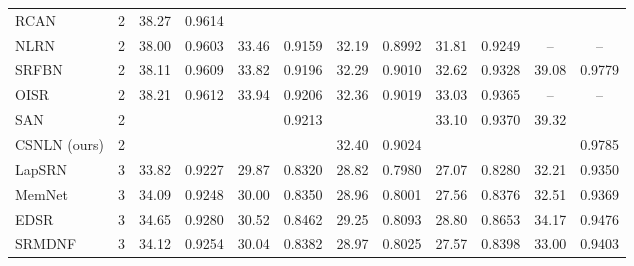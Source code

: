\documentclass[10pt,twocolumn,letterpaper]{article}
\begin{document}
\begin{table*}[thbp]
\begin{center}
\begin{tabular}{|l|c|c|c|c|c|c|c|c|c|c|c|}
\\


RCAN~\cite{zhang2018image} & 2 
& {38.27}
 & {0.9614}
  & \color{red}{34.12}
   & \color{blue}{0.9216}
    & \color{blue}{32.41}
     & \color{blue}{0.9027}
      & \color{red}{33.34}
       & \color{blue}{0.9384}
        & \color{red}{39.44}
         & \color{blue}{0.9786}
\\       
NLRN~\cite{liu2018non}& 2 
& {38.00}
 & {0.9603}
  & {33.46}
   & {0.9159}
    & {32.19}
     & {0.8992}
      & {31.81}
       & {0.9249}
        & {--}
         & {--}
\\
SRFBN~\cite{li2019feedback}& 2 
& {38.11}
 & {0.9609}
  & {33.82}
   & {0.9196}
    & {32.29}
     & {0.9010}
      & {32.62}
       & {0.9328}
        & {39.08}
         &{0.9779}
\\
 OISR~\cite{he2019ode} & 2 
& {38.21}
 & {0.9612}
  & {33.94}
   & {0.9206}
    & {32.36}
     & {0.9019}
      & {33.03}
       & {0.9365}
        &--
         & --      
\\
SAN~\cite{dai2019second} & 2 
& \color{red}{38.31}
 & \color{red}{0.9620}
  & \color{blue}{34.07}
   & {0.9213}
    & \color{red}{32.42}
     & \color{red}{0.9028}
      & {33.10}
       & {0.9370}
        & {39.32}
         & \color{red}{0.9792}
\\
CSNLN (ours) & 2 
& \color{blue}{38.28}
 & \color{blue}{0.9616}
  & \color{red}{34.12}
   & \color{red}{0.9223}
    & {32.40}
     & {0.9024}
      & \color{blue}{33.25}
       & \color{red}{0.9386}
        & \color{blue}{39.37}
         & {0.9785}
\\

                 
\hline
\hline

LapSRN~\cite{lai2017deep} & 3 
& 33.82
 & 0.9227
  & 29.87
   & 0.8320
    & 28.82
     & 0.7980
      & 27.07
       & 0.8280
        & 32.21
         & 0.9350
                   
\\
MemNet~\cite{tai2017memnet} & 3 
& 34.09
 & 0.9248
  & 30.00
   & 0.8350
    & 28.96
     & 0.8001
      & 27.56
       & 0.8376
        & 32.51
         & 0.9369
                   
\\
EDSR~\cite{lim2017enhanced} & 3 
& 34.65
 & 0.9280
  & 30.52
   & 0.8462
    & 29.25
     & 0.8093
      & 28.80
       & 0.8653
        & 34.17
         & 0.9476
                   
\\
SRMDNF~\cite{zhang2018learning} & 3 
& 34.12
 & 0.9254
  & 30.04
   & 0.8382
    & 28.97
     & 0.8025
      & 27.57
       & 0.8398
        & 33.00
         & 0.9403
                   

\end{tabular}
\end{center}
\end{table*}
\end{document}
